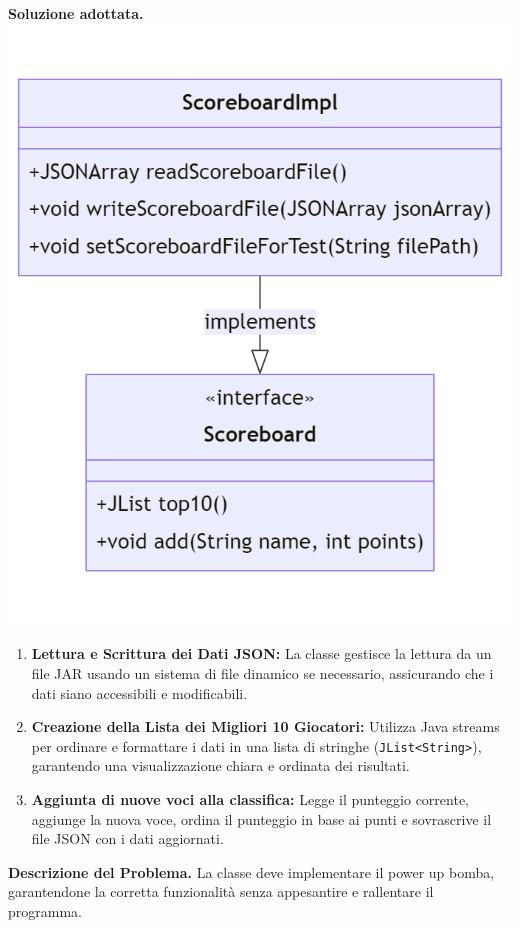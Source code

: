 \documentclass[a4paper,12pt]{report}
\begin{document}
\textbf{Soluzione adottata. } \newline
\includegraphics[width=\textwidth]{Scoreboard.png}
\begin{enumerate}

\item \textbf{Lettura e Scrittura dei Dati JSON:} La classe gestisce la lettura da un file JAR usando un sistema di file dinamico se necessario, assicurando che i dati siano accessibili e modificabili.

\item \textbf{Creazione della Lista dei Migliori 10 Giocatori:} Utilizza Java streams per ordinare e formattare i dati in una lista di stringhe (\texttt{JList<String>}), garantendo una visualizzazione chiara e ordinata dei risultati.

\item \textbf{Aggiunta di nuove voci alla classifica:} Legge il punteggio corrente, aggiunge la nuova voce, ordina il punteggio in base ai punti e sovrascrive il file JSON con i dati aggiornati.

\end{enumerate}
\textbf{Descrizione del Problema.} La classe deve implementare il power up bomba, garantendone la corretta funzionalità senza appesantire e rallentare il programma.
\end{document}
